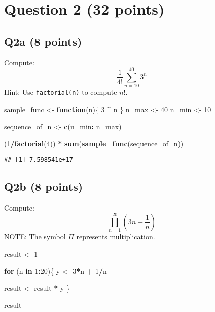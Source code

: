 \documentclass[
]{article}
\newenvironment{Shaded}{\begin{snugshade}}{\end{snugshade}}
\newcommand{\ControlFlowTok}[1]{\textcolor[rgb]{0.13,0.29,0.53}{\textbf{#1}}}
\newcommand{\DecValTok}[1]{\textcolor[rgb]{0.00,0.00,0.81}{#1}}
\newcommand{\FunctionTok}[1]{\textcolor[rgb]{0.13,0.29,0.53}{\textbf{#1}}}
\newcommand{\NormalTok}[1]{#1}
\newcommand{\OtherTok}[1]{\textcolor[rgb]{0.56,0.35,0.01}{#1}}
\newcommand{\SpecialCharTok}[1]{\textcolor[rgb]{0.81,0.36,0.00}{\textbf{#1}}}
\begin{document}
\hypertarget{question-2-32-points}{%
\section{Question 2 (32 points)}\label{question-2-32-points}}

\hypertarget{q2a-8-points}{%
\subsection{Q2a (8 points)}\label{q2a-8-points}}

Compute: \[\frac{1}{4!} \sum_{n=10}^{40}3^{n}\] Hint: Use
\texttt{factorial(n)} to compute \(n!\).

\begin{Shaded}
\begin{Highlighting}[]
\NormalTok{sample\_func }\OtherTok{\textless{}{-}} \ControlFlowTok{function}\NormalTok{(n)\{}
    \DecValTok{3} \SpecialCharTok{\^{}}\NormalTok{ n}
\NormalTok{\}}
\NormalTok{n\_max }\OtherTok{\textless{}{-}} \DecValTok{40}
\NormalTok{n\_min }\OtherTok{\textless{}{-}} \DecValTok{10}

\NormalTok{sequence\_of\_n }\OtherTok{\textless{}{-}} \FunctionTok{c}\NormalTok{(n\_min}\SpecialCharTok{:}\NormalTok{ n\_max)}

\NormalTok{(}\DecValTok{1}\SpecialCharTok{/}\FunctionTok{factorial}\NormalTok{(}\DecValTok{4}\NormalTok{)) }\SpecialCharTok{*} \FunctionTok{sum}\NormalTok{(}\FunctionTok{sample\_func}\NormalTok{(sequence\_of\_n))}
\end{Highlighting}
\end{Shaded}

\begin{verbatim}
## [1] 7.598541e+17
\end{verbatim}

\hypertarget{q2b-8-points}{%
\subsection{Q2b (8 points)}\label{q2b-8-points}}

Compute: \[\prod_{n=1}^{20} \left( 3n + \frac{1}{n} \right)\] NOTE: The
symbol \(\Pi\) represents multiplication.

\begin{Shaded}
\begin{Highlighting}[]
\NormalTok{result }\OtherTok{\textless{}{-}} \DecValTok{1}

\ControlFlowTok{for}\NormalTok{ (n }\ControlFlowTok{in} \DecValTok{1}\SpecialCharTok{:}\DecValTok{20}\NormalTok{)\{}
\NormalTok{  y }\OtherTok{\textless{}{-}} \DecValTok{3}\SpecialCharTok{*}\NormalTok{n }\SpecialCharTok{+} \DecValTok{1}\SpecialCharTok{/}\NormalTok{n}
  
\NormalTok{  result }\OtherTok{\textless{}{-}}\NormalTok{ result }\SpecialCharTok{*}\NormalTok{ y}
\NormalTok{\}}

\NormalTok{result}
\end{Highlighting}
\end{Shaded}
\end{document}
